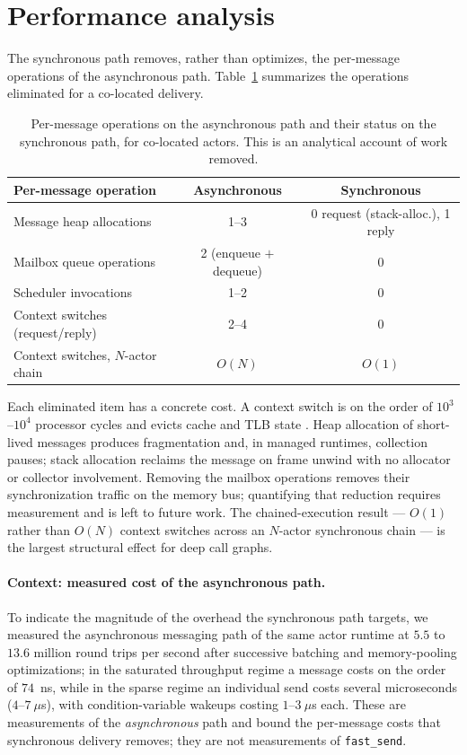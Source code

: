 \documentclass[11pt]{article}
\newcommand{\fs}{\texttt{fast\_send}}
\begin{document}
\section{Performance analysis}
\label{sec:perf}

The synchronous path removes, rather than optimizes, the per-message operations
of the asynchronous path. Table~\ref{tab:elim} summarizes the operations
eliminated for a co-located delivery.

\begin{table}[h]
\centering
\caption{Per-message operations on the asynchronous path and their status on the
synchronous path, for co-located actors. This is an analytical account of work
removed.}
\label{tab:elim}
\small
\begin{tabular}{lcc}
\toprule
Per-message operation & Asynchronous & Synchronous \\
\midrule
Message heap allocations           & 1--3 & 0 request (stack-alloc.), 1 reply \\
Mailbox queue operations           & 2 (enqueue $+$ dequeue) & 0 \\
Scheduler invocations              & 1--2 & 0 \\
Context switches (request/reply)   & 2--4 & 0 \\
Context switches, $N$-actor chain  & $O(N)$ & $O(1)$ \\
\bottomrule
\end{tabular}
\end{table}

Each eliminated item has a concrete cost. A context switch is on the order of
$10^3$--$10^4$ processor cycles and evicts cache and TLB state
\cite{li2007,mcvoy1996,bendersky2018}. Heap allocation
of short-lived messages produces fragmentation and, in managed runtimes,
collection pauses; stack allocation reclaims the message on frame unwind with no
allocator or collector involvement. Removing the mailbox operations removes their
synchronization traffic on the memory bus; quantifying that reduction requires
measurement and is left to future work. The chained-execution
result --- $O(1)$ rather than $O(N)$ context switches across an $N$-actor
synchronous chain --- is the largest structural effect for deep call graphs.

\paragraph{Context: measured cost of the asynchronous path.} To indicate the
magnitude of the overhead the synchronous path targets, we measured the
asynchronous messaging path of the same actor runtime
at $5.5$ to $13.6$ million round trips per second after
successive batching and memory-pooling optimizations; in the saturated
throughput regime a message costs on the order of $74$~ns, while in the sparse
regime an individual send costs several microseconds ($4$--$7~\mu$s), with
condition-variable wakeups costing $1$--$3~\mu$s each. These are measurements of
the \emph{asynchronous} path and bound the per-message costs that synchronous
delivery removes; they are not measurements of \fs{}.
\end{document}
